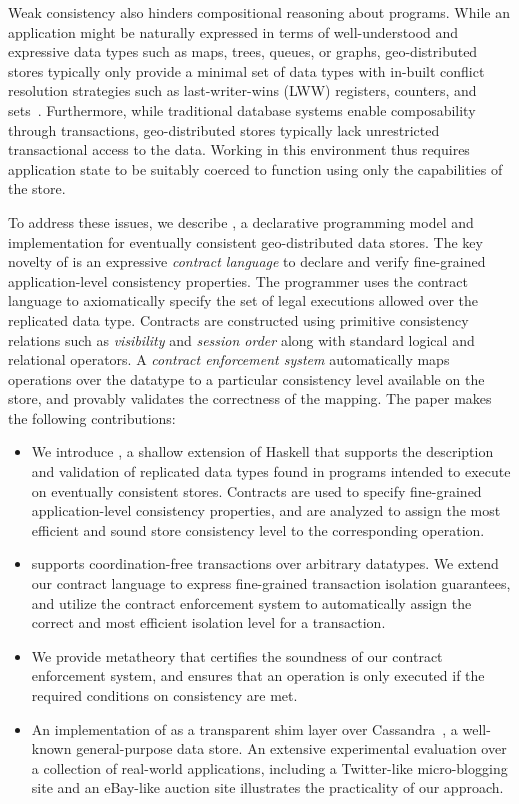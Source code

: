 Weak consistency also hinders compositional reasoning about programs.  While
an application might be naturally expressed in terms of well-understood and
expressive data types such as maps, trees, queues, or graphs,
geo-distributed stores typically only provide a minimal set of data types
with in-built conflict resolution strategies such as last-writer-wins (LWW)
registers, counters, and sets~\cite{Cassandra,DynamoDB}.  Furthermore, while
traditional database systems enable composability through transactions,
geo-distributed stores typically lack unrestricted transactional access to
the data.  Working in this environment thus requires application state to be
suitably coerced to function using only the capabilities of the store.

To address these issues, we describe \name, a declarative programming model
and implementation for eventually consistent geo-distributed data
stores. The key novelty of \name is an expressive \emph{contract language}
to declare and verify fine-grained application-level consistency
properties. The programmer uses the contract language to axiomatically
specify the set of legal executions allowed over the replicated data
type. Contracts are constructed using primitive consistency relations such
as \emph{visibility} and \emph{session order} along with standard logical
and relational operators. A \emph{contract enforcement system} automatically
maps operations over the datatype to a particular consistency level
available on the store, and provably validates the correctness of the
mapping.  The paper makes the following contributions:

\begin{itemize}
\setlength{\itemsep}{2pt}
\item We introduce \name, a shallow extension of Haskell that supports the description
  and validation of replicated data types found in programs intended to
  execute on eventually consistent stores. Contracts are used to specify
  fine-grained application-level consistency properties, and are analyzed to
  assign the most efficient and sound store consistency level to the
  corresponding operation.
\item \name supports coordination-free transactions over arbitrary datatypes.
	We extend our contract language to express fine-grained transaction isolation
	guarantees, and utilize the contract enforcement system to automatically
	assign the correct and most efficient isolation level for a transaction.
\item We provide metatheory that certifies the soundness of our contract
	enforcement system, and ensures that an operation is only executed if the
	required conditions on consistency are met.
\item An implementation of \name as a transparent shim layer over
	Cassandra~\cite{Cassandra}, a well-known general-purpose data store.  An
	extensive experimental evaluation over a collection of real-world
	applications, including a Twitter-like micro-blogging site and an eBay-like
	auction site illustrates the practicality of our approach.
\end{itemize}

